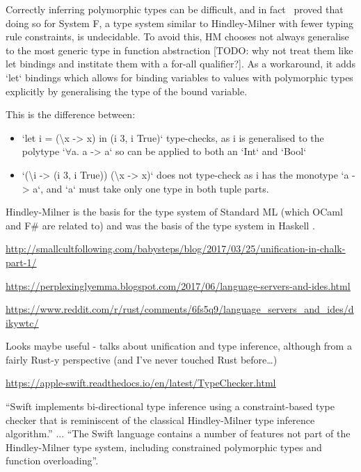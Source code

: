 \documentclass[a4paper,fleqn,12pt]{article}
\begin{document}
Correctly inferring polymorphic types can be difficult, and in fact~\cite{ref13} proved that doing so for System F, a type system similar to Hindley-Milner with fewer typing rule constraints, is undecidable. To avoid this, HM chooses not always generalise to the most generic type in function abstraction [TODO: why not treat them like let bindings and institate them with a for-all qualifier?]. As a workaround, it adds `let` bindings which allows for binding variables to values with polymorphic types explicitly by generalising the type of the bound variable.

This is the difference between:

\begin{itemize}
  \item `let i = (\textbackslash x -> x) in (i 3, i True)` type-checks, as i is generalised to the polytype `$\forall$a. a -> a` so can be applied to both an `Int` and `Bool`
  \item `(\textbackslash i -> (i 3, i True)) (\textbackslash x -> x)` does not type-check as i has the monotype `a -> a`, and `a` must take only one type in both tuple parts.
\end{itemize}

Hindley-Milner is the basis for the type system of Standard ML \citep{ref14} (which OCaml and F\# are related to) and was the basis of the type system in Haskell \citep{ref15}.

\underline{\href{http://smallcultfollowing.com/babysteps/blog/2017/03/25/unification-in-chalk-part-1/}{http://smallcultfollowing.com/babysteps/blog/2017/03/25/unification-in-chalk-part-1/}}

\underline{\href{https://perplexinglyemma.blogspot.com/2017/06/language-servers-and-ides.html}{https://perplexinglyemma.blogspot.com/2017/06/language-servers-and-ides.html}}

\underline{\href{https://www.reddit.com/r/rust/comments/6fs5q9/language\_servers\_and\_ides/dikywtc/}{https://www.reddit.com/r/rust/comments/6fs5q9/language\_servers\_and\_ides/dikywtc/}}

Looks maybe useful - talks about unification and type inference, although from a fairly Rust-y perspective (and I’ve never touched Rust before…)

\underline{\href{https://apple-swift.readthedocs.io/en/latest/TypeChecker.html}{https://apple-swift.readthedocs.io/en/latest/TypeChecker.html}}

“Swift implements bi-directional type inference using a constraint-based type checker that is reminiscent of the classical Hindley-Milner type inference algorithm.” ... “The Swift language contains a number of features not part of the Hindley-Milner type system, including constrained polymorphic types and function overloading”.
\end{document}
